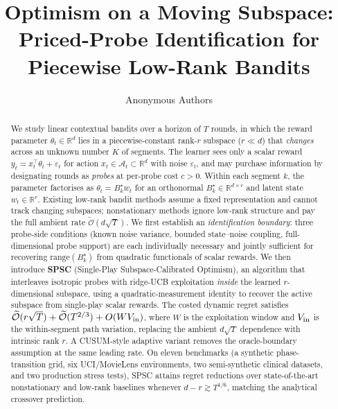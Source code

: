 \documentclass{article}
\title{Optimism on a Moving Subspace:\\Priced-Probe Identification for Piecewise Low-Rank Bandits}
\author{%
  Anonymous Authors%
}
\newcommand{\R}{\mathbb{R}}
\newcommand{\cA}{\mathcal{A}}
\newcommand{\tilO}{\widetilde{\mathcal{O}}}
\newcommand{\range}{\mathrm{range}}
\begin{document}
\maketitle

\begin{abstract}

 We study linear contextual bandits over a horizon of $T$ rounds, in
  which the reward parameter $\theta_t \in \R^d$ lies in a
  piecewise-constant rank-$r$ subspace ($r \ll d$) that
  \emph{changes} across an unknown number $K$ of segments. The
  learner sees only a scalar reward
  $y_t = x_t^\top \theta_t + \varepsilon_t$ for action
  $x_t \in \cA_t \subset \R^d$ with noise $\varepsilon_t$, and may
  purchase information by designating rounds as \emph{probes} at
  per-probe cost $c > 0$. Within each segment $k$, the parameter
  factorises as $\theta_t = B_k^\star w_t$ for an orthonormal
  $B_k^\star \in \R^{d\times r}$ and latent state $w_t \in \R^r$.
  Existing low-rank bandit methods assume a fixed representation and
  cannot track changing subspaces; nonstationary methods ignore
  low-rank structure and pay the full ambient rate
  $\tilO(d\sqrt{T})$. We first establish an \emph{identification boundary}: three
  probe-side conditions (known noise variance, bounded state--noise
  coupling, full-dimensional probe support) are each individually
  necessary and jointly sufficient for recovering
  $\range(B_k^\star)$ from quadratic functionals of scalar rewards.
  We then introduce \textbf{SPSC} (Single-Play Subspace-Calibrated
  Optimism), an algorithm that interleaves isotropic probes with
  ridge-UCB exploitation \emph{inside} the learned $r$-dimensional
  subspace, using a quadratic-measurement identity to recover the
  active subspace from single-play scalar rewards. The costed dynamic
  regret satisfies
  $\tilO(r\sqrt{T})+\tilO(T^{2/3})+O(W V_{\rm in})$, where $W$ is the
  exploitation window and
  $V_{\rm in}$
  is the within-segment path variation, replacing the ambient
  $d\sqrt{T}$ dependence with intrinsic rank $r$. A CUSUM-style
  adaptive variant removes the oracle-boundary assumption at the same
  leading rate. On eleven benchmarks (a synthetic phase-transition grid, six
  UCI/MovieLens environments, two semi-synthetic clinical datasets,
  and two production stress tests), SPSC attains regret reductions
  over state-of-the-art nonstationary and low-rank baselines whenever
  $d-r\gtrsim T^{1/6}$, matching the analytical crossover prediction.


\end{abstract}
\end{document}
